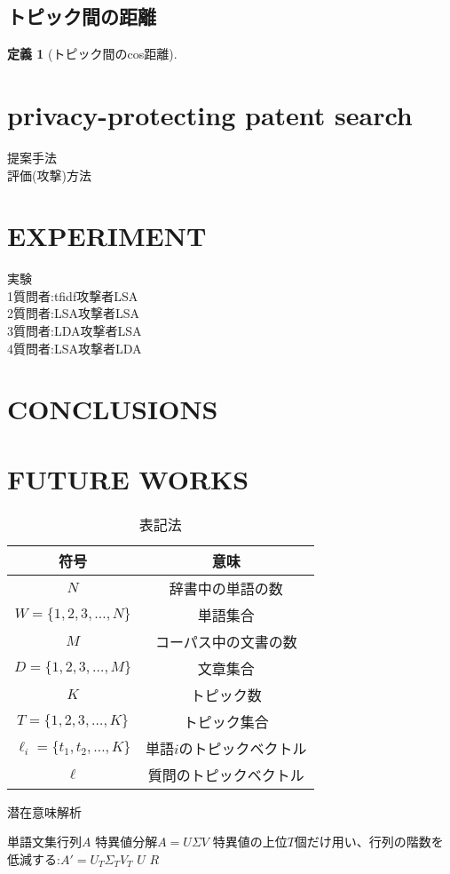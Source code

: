 \documentclass{jsarticle}
\theoremstyle{definition}
\newtheorem{defi}[thm]{定義}
\begin{document}
\subsection{トピック間の距離}

\begin{defi}[トピック間のcos距離]

\end{defi}

\section{privacy-protecting patent search}
提案手法\\
評価(攻撃)方法
\section{EXPERIMENT}
実験\\
1質問者:tfidf攻撃者LSA\\
2質問者:LSA攻撃者LSA\\
3質問者:LDA攻撃者LSA\\
4質問者:LSA攻撃者LDA
\section{CONCLUSIONS}
\section{FUTURE WORKS}

\begin{table}[!hbp]
\center
\begin{tabular}{|c|c|}
\hline
符号 & 意味 \\
\hline
$N$ & 辞書中の単語の数 \\
$W = \{1,2,3, \dots ,N\} $ & 単語集合 \\
$M$ & コーパス中の文書の数 \\
$D = \{1,2,3, \dots ,M\}$ & 文章集合 \\ 
$K$ & トピック数 \\
$T = \{1,2,3, \dots ,K\}$ & トピック集合 \\
$\ell_i = \{t_1,t_2,\dots,K\} $ & 単語$i$のトピックベクトル \\
$\ell$ & 質問のトピックベクトル \\
\hline
\end{tabular}
\caption{表記法}
\end{table}

\begin{algorithm}
\caption{潜在意味解析}
\begin{algorithmic}[1]
    \Require 単語文集行列$A$
    \State 特異値分解$A = U \Sigma V$
	\State 特異値の上位$T$個だけ用い、行列の階数を低減する:$A' = U_T \Sigma_T V_T$
    \State $U$
    \Return $R$
\end{algorithmic}
\end{algorithm}
\end{document}
